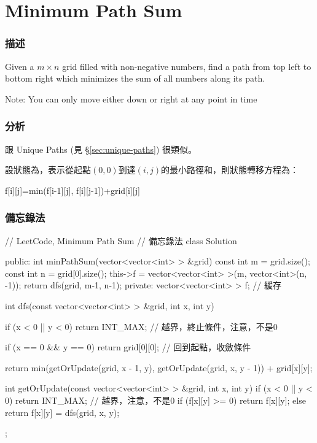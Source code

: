 \section{Minimum Path Sum} %
\label{sec:minimum-path-sum}


\subsubsection{描述}
Given a $m \times n$ grid filled with non-negative numbers, find a path from top left to bottom right which minimizes the sum of all numbers along its path.

Note: You can only move either down or right at any point in time


\subsubsection{分析}
跟 Unique Paths (見 \S \ref{sec:unique-paths}) 很類似。

設狀態為，表示從起點$(0,0)$到達$(i,j)$的最小路徑和，則狀態轉移方程為：
\begin{Code}
f[i][j]=min(f[i-1][j], f[i][j-1])+grid[i][j]
\end{Code}


\subsubsection{備忘錄法}
\begin{Code}
// LeetCode, Minimum Path Sum
// 備忘錄法
class Solution {
public:
    int minPathSum(vector<vector<int> > &grid) {
        const int m = grid.size();
        const int n = grid[0].size();
        this->f = vector<vector<int> >(m, vector<int>(n, -1));
        return dfs(grid, m-1, n-1);
    }
private:
    vector<vector<int> > f;  // 緩存

    int dfs(const vector<vector<int> > &grid, int x, int y) {
        if (x < 0 || y < 0) return INT_MAX; // 越界，終止條件，注意，不是0

        if (x == 0 && y == 0) return grid[0][0]; // 回到起點，收斂條件

        return min(getOrUpdate(grid, x - 1, y),
                getOrUpdate(grid, x, y - 1)) + grid[x][y];
    }

    int getOrUpdate(const vector<vector<int> > &grid, int x, int y) {
        if (x < 0 || y < 0) return INT_MAX; // 越界，注意，不是0
        if (f[x][y] >= 0) return f[x][y];
        else return f[x][y] = dfs(grid, x, y);
    }
};
\end{Code}



